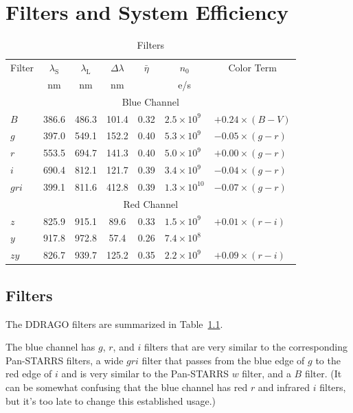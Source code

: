 \chapter{Filters and System Efficiency}

\begin{table}
\centering
\caption{Filters}
\medskip
\label{table:filters}
\footnotesize
\begin{tabular}{lcccccl}
\toprule
Filter&$\lambda_\mathrm{S}$&$\lambda_\mathrm{L}$&$\Delta\lambda$&$\bar\eta$&$n_0$&\multicolumn{1}{c}{Color Term}\\
&nm&nm&nm&&\unit{e/s}\\
\midrule
\multicolumn{7}{c}{Blue Channel}\\
\midrule
$B$   & 386.6 & 486.3 & \phantom{}101.4 & 0.32 & $2.5 \times 10^{9\phantom{0}}$ & $+0.24 \times (B-V)$\\
$g$   & 397.0 & 549.1 & \phantom{}152.2 & 0.40 & $5.3 \times 10^{9\phantom{0}}$ & $-0.05 \times (g-r)$\\
$r$   & 553.5 & 694.7 & \phantom{}141.3 & 0.40 & $5.0 \times 10^{9\phantom{0}}$ & $+0.00 \times (g-r)$\\
$i$   & 690.4 & 812.1 & \phantom{}121.7 & 0.39 & $3.4 \times 10^{9\phantom{0}}$ & $-0.04 \times (g-r)$\\
$gri$ & 399.1 & 811.6 & \phantom{}412.8 & 0.39 & $1.3 \times 10^{10\phantom{}}$ & $-0.07 \times (g-r)$\\
\midrule
\multicolumn{7}{c}{Red Channel}\\
\midrule
$z$   & 825.9 & 915.1 & \phantom{0}89.6 & 0.33 & $1.5 \times 10^{9\phantom{0}}$ & $+0.01 \times (r-i)$\\
$y$   & 917.8 & 972.8 & \phantom{0}57.4 & 0.26 & $7.4 \times 10^{8\phantom{0}}$\\
$zy$  & 826.7 & 939.7 & \phantom{}125.2 & 0.35 & $2.2 \times 10^{9\phantom{0}}$ & $+0.09 \times (r-i)$\\
\bottomrule
\end{tabular}
\end{table}


\section{Filters}

The DDRAGO filters are summarized in Table~\ref{table:filters}.

The blue channel has $g$, $r$, and $i$ filters that are very similar to the corresponding Pan-STARRS filters, a wide $gri$ filter that passes from the blue edge of $g$ to the red edge of $i$ and is very similar to the Pan-STARRS $w$ filter, and a $B$ filter. (It can be somewhat confusing that the blue channel has red $r$ and infrared $i$ filters, but it's too late to change this established usage.)


